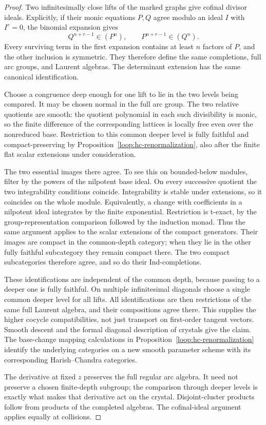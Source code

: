 \begin{proof}
Two infinitesimally close lifts of the marked graphs give cofinal
divisor ideals.  Explicitly, if their monic equations $P,Q$ agree
modulo an ideal $I$ with $I^r=0$, the binomial expansion gives
\[
               Q^{n+r-1}\in(P^n),\qquad
               P^{n+r-1}\in(Q^n).
\]
Every surviving term in the first expansion contains at least $n$
factors of $P$, and the other inclusion is symmetric.  They therefore
define the same completions,
full arc groups, and Laurent algebras.  The determinant extension
has the same canonical identification.

Choose a congruence deep enough for one lift to lie in the two
levels being compared.  It may be chosen normal in the full arc
group.  The two relative quotients are smooth: the quotient polynomial
in each such divisibility is monic, so the finite difference of the
corresponding lattices is locally free even over the nonreduced base.
Restriction to this common deeper level is fully faithful and
compact-preserving by Proposition~\ref{loop:hc-renormalization}, also
after the finite flat scalar extensions under consideration.

The two essential images there agree.  To see this on bounded-below
modules, filter by the powers of the nilpotent base ideal.  On every
successive quotient the two integrability conditions coincide.
Integrability is stable under extensions, so it coincides on the
whole module.  Equivalently, a change with coefficients in a
nilpotent ideal integrates by the finite exponential.  Restriction
is t-exact, by the group-representation comparison followed by the
induction monad.  Thus the same argument applies to the scalar
extensions of the compact generators.  Their images are compact in
the common-depth category; when they lie in the other fully faithful
subcategory they remain compact there.  The two compact subcategories
therefore agree, and so do their Ind-completions.

These identifications are independent of the common depth, because
passing to a deeper one is fully faithful.  On multiple
infinitesimal diagonals choose a single common deeper level for
all lifts.  All identifications are then restrictions of the same
full Laurent algebra, and their compositions agree there.  This
supplies the higher cocycle compatibilities, not just transport on
first-order tangent vectors.  Smooth descent and the formal
diagonal description of crystals give the claim.  The base-change
mapping calculations in Proposition~\ref{loop:hc-renormalization}
identify the underlying categories on a new smooth parameter
scheme with its corresponding Harish--Chandra categories.

The derivative at fixed $z$ preserves the full regular arc
algebra.  It need not preserve a chosen finite-depth subgroup;
the comparison through deeper levels is exactly what makes that
derivative act on the crystal.  Disjoint-cluster products follow
from products of the completed algebras.  The cofinal-ideal
argument applies equally at collisions.
\end{proof}

